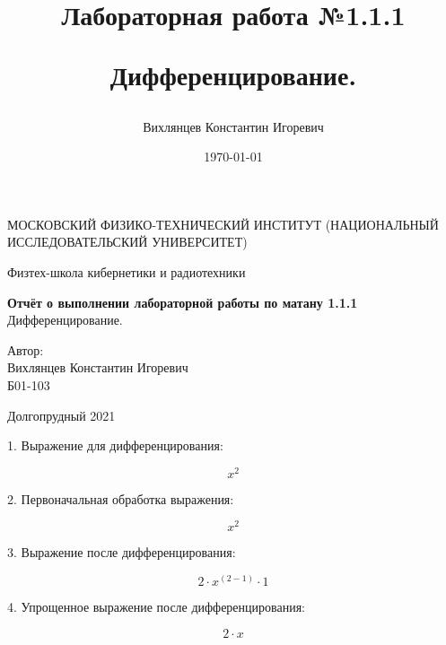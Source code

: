 \documentclass[a4paper,12pt]{article} %
\author{Вихлянцев Константин Игоревич}
\title{Лабораторная работа №1.1.1

Дифференцирование.
}
\date{\today}
\begin{document}
\begin{titlepage}
	\begin{center}
		{\large МОСКОВСКИЙ ФИЗИКО-ТЕХНИЧЕСКИЙ ИНСТИТУТ (НАЦИОНАЛЬНЫЙ ИССЛЕДОВАТЕЛЬСКИЙ УНИВЕРСИТЕТ)}
	\end{center}
	\begin{center}
		{\large Физтех-школа кибернетики и радиотехники}
	\end{center}
	
	
	\vspace{1cm}
	{\huge
		\begin{center}
			{\bf Отчёт о выполнении лабораторной работы по матану 1.1.1}\\
			Дифференцирование.
		\end{center}
	}
	\vspace{1cm}
	\begin{flushright}
		{\LARGE Автор:\\ Вихлянцев Константин Игоревич \\
			\vspace{0.2cm}
			Б01-103}
	\end{flushright}
	\vspace{1cm}
	\begin{center}
		Долгопрудный 2021
	\end{center}
\end{titlepage}

1. Выражение для дифференцирования:

\[x^{2}\]

2. Первоначальная обработка выражения:

\[x^{2}\]

3. Выражение после дифференцирования:

\[{2}\cdot{{x^{(2-1)}}\cdot{1}}\]

4. Упрощенное выражение после дифференцирования:

\[{2}\cdot{x}\]
\end{document}
